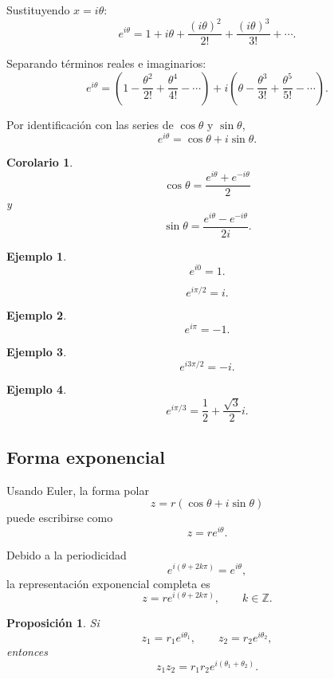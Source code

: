 \documentclass[12pt]{article}
\newtheorem{Ejem}{Ejemplo}
\newtheorem{Prop}{Proposici\'on}
\newtheorem{Coro}{Corolario}
\begin{document}
Sustituyendo $x=i\theta$:
\[
e^{i\theta}
=
1+i\theta+\frac{(i\theta)^2}{2!}
+\frac{(i\theta)^3}{3!}+\cdots.
\]

Separando términos reales e imaginarios:
\[
e^{i\theta}
=
\left(
1-\frac{\theta^2}{2!}
+\frac{\theta^4}{4!}
-\cdots
\right)
+
i
\left(
\theta-\frac{\theta^3}{3!}
+\frac{\theta^5}{5!}
-\cdots
\right).
\]

Por identificación con las series de $\cos\theta$ y $\sin\theta$,
\[
\boxed{
e^{i\theta}
=
\cos\theta+i\sin\theta.
}
\]

\begin{Coro}
\[
\boxed{
\cos\theta
=
\frac{e^{i\theta}+e^{-i\theta}}{2}
}
\]
y
\[
\boxed{
\sin\theta
=
\frac{e^{i\theta}-e^{-i\theta}}{2i}.
}
\]

\end{Coro}

\begin{Ejem} 
\[
e^{i0}=1.
\]

\[
e^{i\pi/2}=i.
\]
\end{Ejem}


\begin{Ejem}

\[
e^{i\pi}=-1.
\]

\end{Ejem}


\begin{Ejem}
\[
e^{i3\pi/2}=-i.
\]

\end{Ejem}


\begin{Ejem}
\[
e^{i\pi/3}
=
\frac12+\frac{\sqrt3}{2}i.
\]
\end{Ejem}



\subsection*{Forma exponencial}

Usando Euler, la forma polar
\[
z=r(\cos\theta+i\sin\theta)
\]
puede escribirse como
\[
\boxed{
z=re^{i\theta}.
}
\]

Debido a la periodicidad
\[
e^{i(\theta+2k\pi)}
=
e^{i\theta},
\]
la representación exponencial completa es
\[
\boxed{
z=re^{i(\theta+2k\pi)},
\qquad
k\in\mathbb{Z}.
}
\]



\begin{Prop}
Si
\[
z_1=r_1e^{i\theta_1},
\qquad
z_2=r_2e^{i\theta_2},
\]
entonces
\[
z_1z_2
=
r_1r_2e^{i(\theta_1+\theta_2)}.
\]

\end{Prop}
\end{document}
